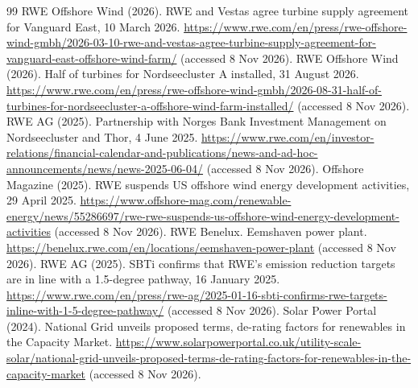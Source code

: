 \documentclass[11pt,a4paper]{article}
\begin{document}
\begin{thebibliography}{99}
 RWE Offshore Wind (2026). RWE and Vestas agree turbine supply agreement for Vanguard East, 10 March 2026. \url{https://www.rwe.com/en/press/rwe-offshore-wind-gmbh/2026-03-10-rwe-and-vestas-agree-turbine-supply-agreement-for-vanguard-east-offshore-wind-farm/} (accessed 8 Nov 2026).
 RWE Offshore Wind (2026). Half of turbines for Nordseecluster A installed, 31 August 2026. \url{https://www.rwe.com/en/press/rwe-offshore-wind-gmbh/2026-08-31-half-of-turbines-for-nordseecluster-a-offshore-wind-farm-installed/} (accessed 8 Nov 2026).
 RWE AG (2025). Partnership with Norges Bank Investment Management on Nordseecluster and Thor, 4 June 2025. \url{https://www.rwe.com/en/investor-relations/financial-calendar-and-publications/news-and-ad-hoc-announcements/news/news-2025-06-04/} (accessed 8 Nov 2026).
 Offshore Magazine (2025). RWE suspends US offshore wind energy development activities, 29 April 2025. \url{https://www.offshore-mag.com/renewable-energy/news/55286697/rwe-rwe-suspends-us-offshore-wind-energy-development-activities} (accessed 8 Nov 2026).
 RWE Benelux. Eemshaven power plant. \url{https://benelux.rwe.com/en/locations/eemshaven-power-plant} (accessed 8 Nov 2026).
 RWE AG (2025). SBTi confirms that RWE's emission reduction targets are in line with a 1.5-degree pathway, 16 January 2025. \url{https://www.rwe.com/en/press/rwe-ag/2025-01-16-sbti-confirms-rwe-targets-inline-with-1-5-degree-pathway/} (accessed 8 Nov 2026).
 Solar Power Portal (2024). National Grid unveils proposed terms, de-rating factors for renewables in the Capacity Market. \url{https://www.solarpowerportal.co.uk/utility-scale-solar/national-grid-unveils-proposed-terms-de-rating-factors-for-renewables-in-the-capacity-market} (accessed 8 Nov 2026).
\end{thebibliography}
\end{document}
